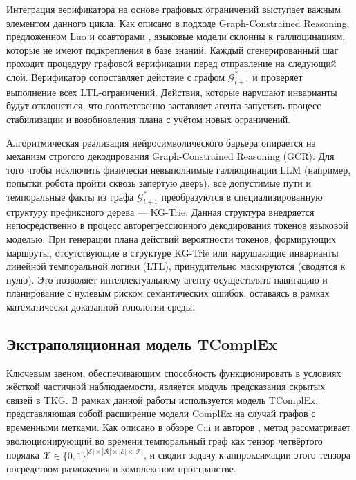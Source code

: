 Интеграция верификатора на основе графовых ограничений выступает важным элементом данного цикла. Как описано в подходе Graph-Constrained Reasoning, предложенном Luo и соавторами \cite{ref8}, языковые модели склонны к галлюцинациям, которые не имеют подкрепления в базе знаний. Каждый сгенерированный шаг проходит процедуру графовой верификации перед отправление на следующий слой. Верификатор сопоставляет действие с графом $\displaystyle \mathcal{G}_{t+1}^*$ и проверяет выполнение всех LTL-ограничений. Действия, которые нарушают инварианты будут отклоняться, что соответсвенно заставляет агента запустить процесс стабилизации и возобновления плана с учётом новых ограничений.

Алгоритмическая реализация нейросимволического барьера опирается на механизм строгого декодирования Graph-Constrained Reasoning (GCR). Для того чтобы исключить физически невыполнимые галлюцинации LLM (например, попытки робота пройти сквозь запертую дверь), все допустимые пути и темпоральные факты из графа $\mathcal{G}_{t+1}^*$ преобразуются в специализированную структуру префиксного дерева — KG-Trie. Данная структура внедряется непосредственно в процесс авторегрессионного декодирования токенов языковой моделью. При генерации плана действий вероятности токенов, формирующих маршруты, отсутствующие в структуре KG-Trie или нарушающие инварианты линейной темпоральной логики (LTL), принудительно маскируются (сводятся к нулю). Это позволяет интеллектуальному агенту осуществлять навигацию и планирование с нулевым риском семантических ошибок, оставаясь в рамках математически доказанной топологии среды.

\subsection{Экстраполяционная модель TComplEx}
\label{sec:tcomplex}

Ключевым звеном, обеспечивающим способность функционировать в условиях жёсткой частичной наблюдаемости, является модуль предсказания скрытых связей в TKG. В рамках данной работы используется модель TComplEx, представляющая собой расширение модели ComplEx на случай графов с временными метками. Как описано в обзоре Cai и авторов \cite{ref47}, метод рассматривает эволюционирующий во времени темпоральный граф как тензор четвёртого порядка $\displaystyle \mathcal{X} \in \{0, 1\}^{|\mathcal{E}| \times |\mathcal{R}| \times |\mathcal{E}| \times |\mathcal{T}|}$, и сводит задачу к аппроксимации этого тензора посредством разложения в комплексном пространстве.

